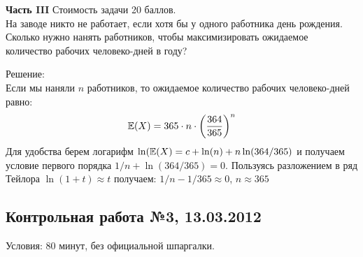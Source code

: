 \documentclass[12pt, a4paper]{article}\usepackage[]{graphicx}\usepackage[]{color}
\begin{document}
		\textbf{Часть III} Стоимость задачи 20 баллов. \\ %


		На заводе никто не работает, если хотя бы у одного работника день рождения. Сколько нужно нанять работников, чтобы максимизировать ожидаемое количество рабочих человеко-дней в году?


		Решение: \\

		Если мы наняли $n$ работников, то ожидаемое количество рабочих человеко-дней равно:
		\begin{equation}
		\mathbb{E}(X)=365\cdot n\cdot \left(\frac{364}{365}\right)^{n}
		\end{equation}
		Для удобства берем логарифм $\ln(\mathbb{E}(X)=c+\ln(n)+n\ln(364/365)$ и получаем условие первого порядка $1/n+\ln(364/365)=0$. Пользуясь разложением в ряд Тейлора $\ln(1+t)\approx t$ получаем: $1/n-1/365\approx 0$, $n\approx 365$








		\subsection{Контрольная работа №3, 13.03.2012}

		Условия: 80 минут, без официальной шпаргалки.
\end{document}
